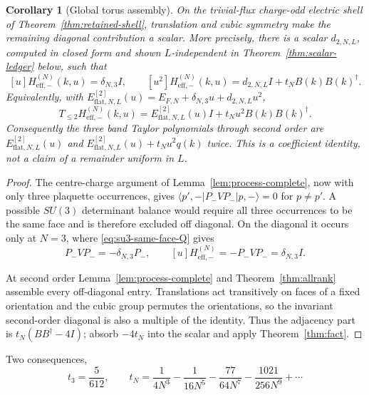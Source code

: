 \documentclass[11pt]{article}
\theoremstyle{plain}
\newtheorem{corollary}[theorem]{Corollary}
\theoremstyle{definition}
\theoremstyle{remark}
\newcommand{\chk}[1]{}
\newcommand{\dg}{^{\dagger}}
\begin{document}
\begin{corollary}[Global torus assembly]\label{cor:assembly}
On the trivial-flux charge-odd electric shell of
Theorem~\ref{thm:retained-shell}, translation and cubic symmetry make the
remaining diagonal contribution a scalar.  More precisely, there is a scalar
$d_{2,N,L}$, computed in closed form and shown $L$-independent in
Theorem~\ref{thm:scalar-ledger} below, such that
\[
 [u]H^{(N)}_{\mathrm{eff},-}(k,u)=\delta_{N,3}I,
 \qquad
 [u^2]H^{(N)}_{\mathrm{eff},-}(k,u)
 =d_{2,N,L}I+t_NB(k)B(k)\dg .
\]
Equivalently, with
$E_{\mathrm{flat},N,L}^{[2]}(u)=E_{F,N}+\delta_{N,3}u+d_{2,N,L}u^2$,
\[
  T_{\le2}H^{(N)}_{\mathrm{eff},-}(k,u)
  =E_{\mathrm{flat},N,L}^{[2]}(u)I+t_Nu^2B(k)B(k)\dg .
\]
Consequently the three band Taylor polynomials through second order are
$E_{\mathrm{flat},N,L}^{[2]}(u)$ and
$E_{\mathrm{flat},N,L}^{[2]}(u)+t_Nu^2q(k)$ twice.  This is a coefficient
identity, not a claim of a remainder uniform in $L$.
\end{corollary}

\begin{proof}
The centre-charge argument of Lemma~\ref{lem:process-complete}, now with only
three plaquette occurrences, gives
$\langle p',-|P_-VP_-|p,-\rangle=0$ for $p\ne p'$. A possible $SU(3)$
determinant balance would require all three occurrences to be the same face
and is therefore excluded off diagonal. On the diagonal it occurs only at
$N=3$, where \eqref{eq:su3-same-face-Q} gives
\[
 P_-VP_-=-\delta_{N,3}P_-,
 \qquad
 [u]H^{(N)}_{\mathrm{eff},-}=-P_-VP_-=\delta_{N,3}I .
\]

At second order Lemma~\ref{lem:process-complete} and
Theorem~\ref{thm:allrank} assemble every off-diagonal entry. Translations act
transitively on faces of a fixed orientation and the cubic group permutes the
orientations, so the invariant second-order diagonal is also a multiple of the
identity. Thus the adjacency part is
$t_N(BB\dg-4I)$; absorb $-4t_N$ into the scalar and apply
Theorem~\ref{thm:fact}.
\end{proof}

Two consequences,
\begin{equation}\label{eq:tsmall}
  t_3=\frac{5}{612},\qquad
  t_N=\frac1{4N^3}-\frac1{16N^5}-\frac{77}{64N^7}-\frac{1021}{256N^9}+\cdots
\end{equation}
\chk{t\_2 = 0 and t\_3 = 5/612}\chk{large-N expansion of t\_N through 1/N\^{}9}
\end{document}
